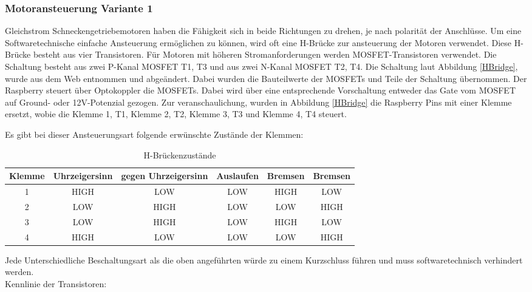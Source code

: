 \subsubsection{Motoransteuerung Variante 1}
Gleichstrom Schneckengetriebemotoren haben die Fähigkeit sich in beide Richtungen zu drehen, je nach polarität der Anschlüsse. Um eine Softwaretechnische einfache Ansteuerung ermöglichen zu können, wird oft eine H-Brücke zur ansteuerung der Motoren verwendet. Diese H-Brücke besteht aus vier Transistoren. Für Motoren mit höheren Stromanforderungen werden MOSFET-Transistoren verwendet. Die Schaltung besteht aus zwei P-Kanal MOSFET T1, T3 und aus zwei N-Kanal MOSFET T2, T4. Die Schaltung laut Abbildung \ref{HBridge}, wurde aus dem Web entnommen und abgeändert. Dabei wurden die Bauteilwerte der MOSFETs und Teile der Schaltung übernommen. Der Raspberry steuert über Optokoppler die MOSFETs. Dabei wird über eine entsprechende Vorschaltung entweder das Gate vom MOSFET auf Ground- oder 12V-Potenzial gezogen. Zur veranschaulichung, wurden in Abbildung \ref{HBridge} die Raspberry Pins mit einer Klemme ersetzt, wobie die Klemme 1, T1, Klemme 2, T2, Klemme 3, T3 und Klemme 4, T4 steuert. 

Es gibt bei dieser Ansteuerungsart folgende erwünschte Zustände der Klemmen: \\
\begin{table}[htb]
\centering
\begin{tabular}{|c|c|c|c|c|c|} \hline
Klemme & Uhrzeigersinn & gegen Uhrzeigersinn & Auslaufen & Bremsen & Bremsen \\ \hline
1 & HIGH & LOW & LOW & HIGH & LOW  \\ \hline
2 & LOW & HIGH & LOW & LOW & HIGH \\ \hline
3 & LOW & HIGH & LOW & HIGH & LOW \\ \hline
4 & HIGH & LOW & LOW & LOW & HIGH \\ \hline
\end{tabular}
\caption{H-Brückenzustände}
\label{HBridge states}
\end{table}

Jede Unterschiedliche Beschaltungsart als die oben angeführten würde zu einem Kurzschluss führen und muss softwaretechnisch verhindert werden. \\


Kennlinie der Transistoren:

